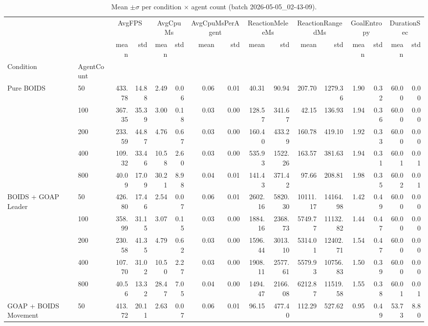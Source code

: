 \begin{table}[htbp]
  \centering
  \caption{Mean $\pm\sigma$ per condition $\times$ agent count (batch 2026-05-05_02-43-09).}
  \label{tab:summary-mean-sigma}
\begin{tabular}{llrrrrrrrrrrrrrr}
\toprule
 &  & \multicolumn{2}{c}{AvgFPS} & \multicolumn{2}{c}{AvgCpuMs} & \multicolumn{2}{c}{AvgCpuMsPerAgent} & \multicolumn{2}{c}{ReactionMeleeMs} & \multicolumn{2}{c}{ReactionRangedMs} & \multicolumn{2}{c}{GoalEntropy} & \multicolumn{2}{c}{DurationSec} \\
 &  & mean & std & mean & std & mean & std & mean & std & mean & std & mean & std & mean & std \\
Condition & AgentCount &  &  &  &  &  &  &  &  &  &  &  &  &  &  \\
\midrule
\multirow[t]{5}{*}{Pure BOIDS} & 50 & 433.78 & 14.88 & 2.49 & 0.06 & 0.06 & 0.01 & 40.31 & 90.94 & 207.70 & 1279.36 & 1.90 & 0.32 & 60.00 & 0.00 \\
 & 100 & 367.35 & 35.39 & 3.00 & 0.18 & 0.03 & 0.00 & 128.57 & 341.67 & 42.15 & 136.93 & 1.94 & 0.36 & 60.00 & 0.00 \\
 & 200 & 233.59 & 44.87 & 4.76 & 0.67 & 0.03 & 0.00 & 160.40 & 433.29 & 160.78 & 419.10 & 1.92 & 0.33 & 60.00 & 0.00 \\
 & 400 & 109.32 & 33.46 & 10.58 & 2.60 & 0.03 & 0.00 & 535.93 & 1522.26 & 163.57 & 381.63 & 1.94 & 0.31 & 60.01 & 0.01 \\
 & 800 & 40.09 & 17.09 & 30.21 & 8.98 & 0.04 & 0.01 & 141.43 & 371.42 & 97.66 & 208.81 & 1.98 & 0.35 & 60.02 & 0.01 \\
\cline{1-16}
\multirow[t]{5}{*}{BOIDS + GOAP Leader} & 50 & 426.80 & 17.46 & 2.54 & 0.07 & 0.06 & 0.01 & 2602.16 & 5820.30 & 10111.17 & 14164.98 & 1.42 & 0.49 & 60.00 & 0.00 \\
 & 100 & 358.99 & 31.15 & 3.07 & 0.15 & 0.03 & 0.00 & 1884.16 & 2368.73 & 5749.77 & 11132.82 & 1.44 & 0.47 & 60.00 & 0.00 \\
 & 200 & 230.58 & 41.35 & 4.79 & 0.62 & 0.03 & 0.00 & 1596.44 & 3013.10 & 5314.01 & 12402.71 & 1.54 & 0.47 & 60.00 & 0.00 \\
 & 400 & 107.70 & 31.02 & 10.50 & 2.27 & 0.03 & 0.00 & 1908.11 & 2577.61 & 5579.93 & 10756.83 & 1.50 & 0.39 & 60.00 & 0.00 \\
 & 800 & 40.56 & 13.32 & 28.47 & 7.05 & 0.04 & 0.00 & 1494.47 & 2166.08 & 6212.87 & 11519.58 & 1.55 & 0.38 & 60.01 & 0.01 \\
\cline{1-16}
\multirow[t]{5}{*}{GOAP + BOIDS Movement} & 50 & 413.72 & 20.11 & 2.63 & 0.07 & 0.06 & 0.01 & 96.15 & 477.40 & 112.29 & 527.62 & 0.95 & 0.49 & 53.73 & 8.80 \\

\end{tabular}
\end{table}
